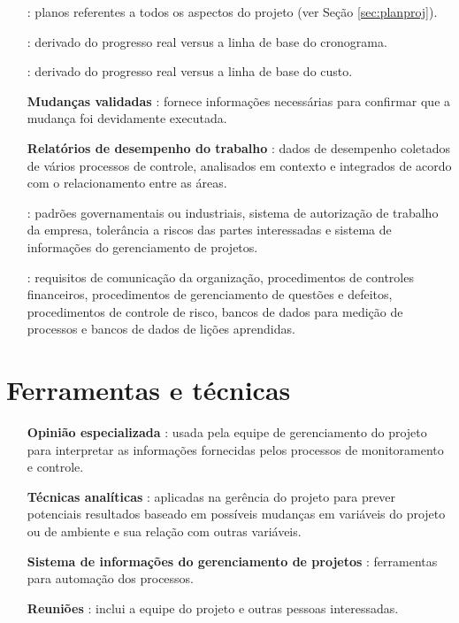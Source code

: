 \begin{itemize}
	
	\item[\textbf{\planproj}]: planos referentes a todos os aspectos do projeto (ver Seção \ref{sec:planproj}).
	
	\item[\textbf{\schfor}]: derivado do progresso real versus a linha de base do cronograma.
	
	\item[\textbf{\costfor}]: derivado do progresso real versus a linha de base do custo.
		
	\item[\textbf{Mudanças validadas}]: fornece informações necessárias para confirmar que a mudança foi devidamente executada.
	
	\item[\textbf{Relatórios de desempenho do trabalho}]: dados de desempenho coletados de vários processos de controle, analisados em contexto e integrados de acordo com o relacionamento entre as áreas.
		
	\item[\textbf{\amb}]: padrões governamentais ou industriais, sistema de autorização de trabalho da empresa, tolerância a riscos das partes interessadas e sistema de informações do gerenciamento de projetos. 
	
	\item[\textbf{\ativ}]: requisitos de comunicação da organização, procedimentos de controles financeiros, procedimentos de gerenciamento de questões e defeitos, procedimentos de controle de risco, bancos de dados para medição de processos e bancos de dados de lições aprendidas.
	
\end{itemize}

\section{Ferramentas e técnicas}

\begin{itemize}
	
	\item[\textbf{Opinião especializada}]: usada pela equipe de gerenciamento do projeto para interpretar as informações fornecidas pelos processos de monitoramento e controle.

	\item[\textbf{Técnicas analíticas}]: aplicadas na gerência do projeto para prever potenciais resultados baseado em possíveis mudanças em variáveis do projeto ou de ambiente e sua relação com outras variáveis.
	
	\item[\textbf{Sistema de informações do gerenciamento de projetos}]: ferramentas para automação dos processos.
	
	\item[\textbf{Reuniões}]: inclui a equipe do projeto e outras pessoas interessadas.
	
\end{itemize}

